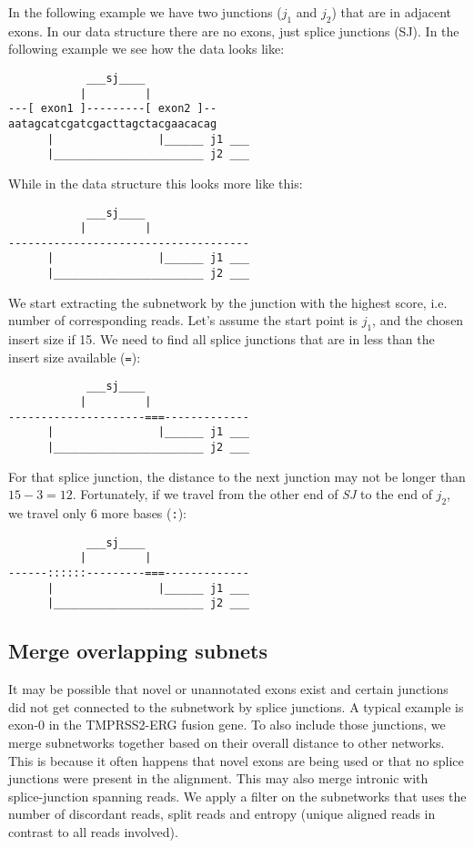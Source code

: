 \documentclass{article}
\theoremstyle{definition}
\begin{document}
In the following example we have two junctions ($j_1$ and $j_2$) that are in adjacent exons.
In our data structure there are no exons, just splice junctions (SJ).
In the following example we see how the data looks like:
\begin{verbatim}
            ___sj____
           |         |
---[ exon1 ]---------[ exon2 ]--
aatagcatcgatcgacttagctacgaacacag
      |                |______ j1 ___
      |_______________________ j2 ___
\end{verbatim}
While in the data structure this looks more like this:
\begin{verbatim}
            ___sj____
           |         |
-------------------------------------
      |                |______ j1 ___
      |_______________________ j2 ___
\end{verbatim}
We start extracting the subnetwork by the junction with the highest score, i.e. number of corresponding reads.
Let's  assume the start point is $j_1$, and the chosen insert size if 15.
We need to find all splice junctions that are in less than the insert size available (\verb|=|):
\begin{verbatim}
            ___sj____
           |         |
---------------------===-------------
      |                |______ j1 ___
      |_______________________ j2 ___
\end{verbatim}
For that splice junction, the distance to the next junction may not be longer than $15-3=12$.
Fortunately, if we travel from the other end of \textit{SJ} to the end of $j_2$, we travel only 6 more bases (\verb|:|):
\begin{verbatim}
            ___sj____
           |         |
------::::::---------===-------------
      |                |______ j1 ___
      |_______________________ j2 ___
\end{verbatim}



\subsection{Merge overlapping subnets}
It may be possible that novel or unannotated exons exist and certain junctions did not get connected to the subnetwork by splice junctions.
A typical example is exon-0 in the TMPRSS2-ERG fusion gene.
To also include those junctions, we merge subnetworks together based on their overall distance to other networks.
This is because it often happens that novel exons are being used or that no splice junctions were present in the alignment.
This may also merge intronic with splice-junction spanning reads.
We apply a filter on the subnetworks that uses the number of discordant reads, split reads and entropy (unique aligned reads in contrast to all reads involved).
\end{document}
